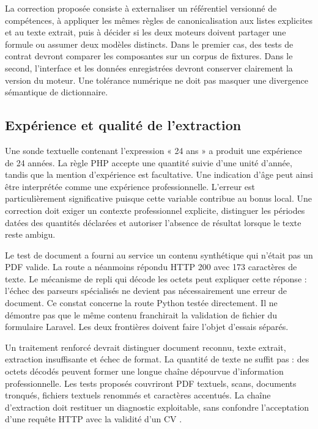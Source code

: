 La correction proposée consiste à externaliser un référentiel versionné de compétences, à appliquer les mêmes règles de canonicalisation aux listes explicites et au texte extrait, puis à décider si les deux moteurs doivent partager une formule ou assumer deux modèles distincts. Dans le premier cas, des tests de contrat devront comparer les composantes sur un corpus de fixtures. Dans le second, l'interface et les données enregistrées devront conserver clairement la version du moteur. Une tolérance numérique ne doit pas masquer une divergence sémantique de dictionnaire.

\subsection{Expérience et qualité de l'extraction}

Une sonde textuelle contenant l'expression « 24 ans » a produit une expérience de 24 années. La règle PHP accepte une quantité suivie d'une unité d'année, tandis que la mention d'expérience est facultative. Une indication d'âge peut ainsi être interprétée comme une expérience professionnelle. L'erreur est particulièrement significative puisque cette variable contribue au bonus local. Une correction doit exiger un contexte professionnel explicite, distinguer les périodes datées des quantités déclarées et autoriser l'absence de résultat lorsque le texte reste ambigu.

Le test de document a fourni au service un contenu synthétique qui n'était pas un PDF valide. La route a néanmoins répondu HTTP 200 avec 173 caractères de texte. Le mécanisme de repli qui décode les octets peut expliquer cette réponse : l'échec des parseurs spécialisés ne devient pas nécessairement une erreur de document. Ce constat concerne la route Python testée directement. Il ne démontre pas que le même contenu franchirait la validation de fichier du formulaire Laravel. Les deux frontières doivent faire l'objet d'essais séparés.

Un traitement renforcé devrait distinguer document reconnu, texte extrait, extraction insuffisante et échec de format. La quantité de texte ne suffit pas : des octets décodés peuvent former une longue chaîne dépourvue d'information professionnelle. Les tests proposés couvriront PDF textuels, scans, documents tronqués, fichiers textuels renommés et caractères accentués. La chaîne d'extraction doit restituer un diagnostic exploitable, sans confondre l'acceptation d'une requête HTTP avec la validité d'un CV \cite{pdfminer-docs,owasp-upload}.

